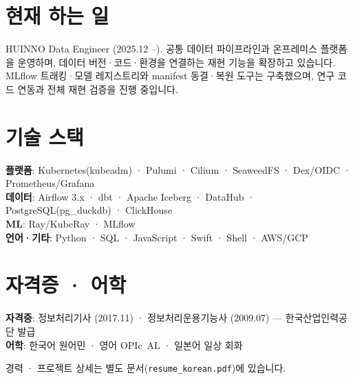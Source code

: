 \section{현재 하는 일}
\begin{itemize}[leftmargin=0.15in, label={}]
\small{\item{HUINNO Data Engineer (2025.12 --). 공통 데이터 파이프라인과 온프레미스 플랫폼을 운영하며, 데이터 버전·코드·환경을 연결하는 재현 기능을 확장하고 있습니다. MLflow 트래킹·모델 레지스트리와 manifest 동결·복원 도구는 구축했으며, 연구 코드 연동과 전체 재현 검증을 진행 중입니다.}}
\end{itemize}
\section{기술 스택}
\begin{itemize}[leftmargin=0.15in, label={}]
    \small{\item{
    \textbf{플랫폼}: Kubernetes(kubeadm) · Pulumi · Cilium · SeaweedFS · Dex/OIDC · Prometheus/Grafana \\[2pt]
    \textbf{데이터}: Airflow 3.x · dbt · Apache Iceberg · DataHub · PostgreSQL(pg\_duckdb) · ClickHouse \\[2pt]
    \textbf{ML}: Ray/KubeRay · MLflow \\[2pt]
    \textbf{언어·기타}: Python · SQL · JavaScript · Swift · Shell · AWS/GCP
    }}
\end{itemize}

\section{자격증 · 어학}
\begin{itemize}[leftmargin=0.15in, label={}]
    \small{\item{
    \textbf{자격증}: 정보처리기사 \mbox{(2017.11)} · 정보처리운용기능사 \mbox{(2009.07)} — 한국산업인력공단 발급 \\[2pt]
    \textbf{어학}: 한국어 원어민 · 영어 \mbox{OPIc AL} · 일본어 일상 회화
    }}
\end{itemize}

\vspace{6pt}
{\small 경력 · 프로젝트 상세는 별도 문서(\texttt{resume\_korean.pdf})에 있습니다.}
